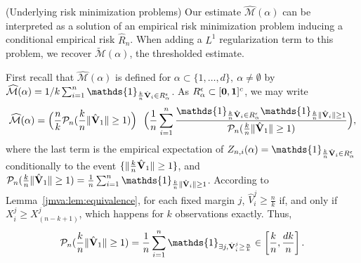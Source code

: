 \begin{remark}{(\sc Underlying risk minimization problems)}
\label{jmva:rk:optim}
Our estimate $\widehat{\mathcal{M}}(\alpha)$ can be interpreted as a solution of an empirical risk minimization problem inducing a conditional empirical risk $\widehat R_n$.
When adding a $L^1$ regularization term to this problem, we recover $\widetilde{\mathcal{M}}(\alpha)$, the thresholded estimate.

First recall that $\widehat{\mathcal{M}}(\alpha)$ is defined for $\alpha \subset \{1,\ldots,d\},~\alpha \neq \emptyset $ by $\widehat{\mathcal{M}}(\alpha) = 1/k \sum_{i=1}^{n} \mathds{1}_{\frac{k}{n} \hat{\mb V}_i \in R_\alpha^\epsilon}$. As $R_\alpha^\epsilon \subset [\mathbf 0, \mathbf 1]^c$, we may write
\begin{align*}
\widehat{\mathcal{M}}(\alpha) = \Big( \frac{n}{k} \mathcal{P}_n(\frac{k}{n} \| \hat{\mb V}_1 \| \ge 1) \Big) ~~ \Big( \frac{1}{n} \sum_{i=1}^n \frac{\mathds{1}_{\frac{k}{n} \hat{\mb V}_i \in R_\alpha^\epsilon} \mathds{1}_{\frac{k}{n} \| \hat{\mb V}_i \| \ge 1}}{ \mathcal{P}_n(\frac{k}{n} \| \hat{\mb V}_1 \| \ge 1)}\Big),
\end{align*}
where the last term is the empirical expectation of $Z_{n, i}(\alpha) = \mathds{1}_{\frac{k}{n} \hat{\mb V}_i \in R_\alpha^\epsilon}$ conditionally to the event $\{\|\frac{k}{n} \hat{\mathbf V}_1 \| \ge 1 \}$, and $\mathcal{P}_n(\frac{k}{n} \| \hat{\mb V}_1 \| \ge 1) = \frac{1}{n} \sum_{i=1}^n \mathds{1}_{\frac{k}{n} \|\hat{\mb V}_i\| \ge 1}$.
According to  Lemma~\ref{jmva:lem:equivalence}, for each fixed margin $j$, $\hat{V}_i^j  \ge \frac{n}{k}$ if, and only if $X_i^j \ge X_{(n-k+1)}^j$, which happens for $k$ observations exactly. Thus, $$\mathcal{P}_n(\frac{k}{n} \| \hat{\mb V}_1 \| \ge 1) = \frac{1}{n} \sum_{i=1}^n \mathds{1}_{\exists j,  \hat{\mb V}_i^j  \ge \frac{n}{k}} \in \left[\frac{k}{n}, \frac{dk}{n}\right].$$

\end{remark}
